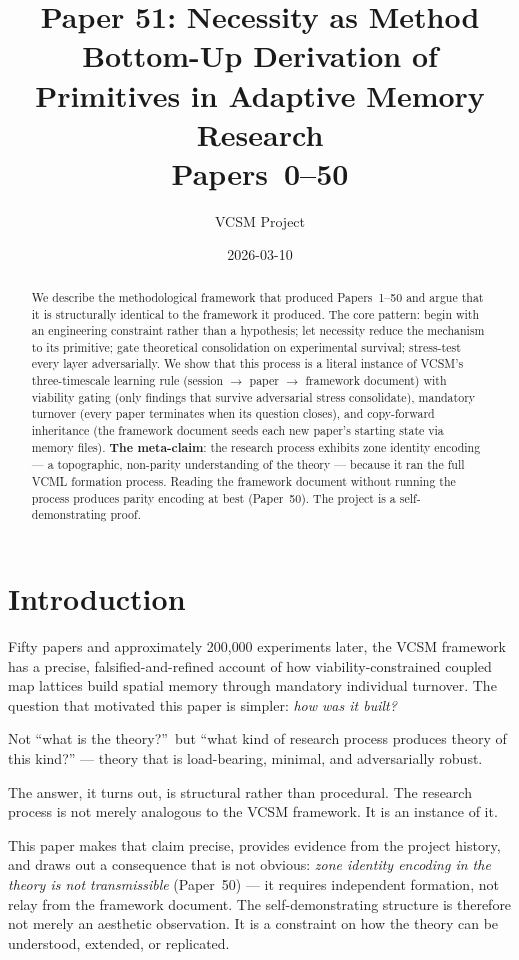 \documentclass[11pt,a4paper]{article}
\title{\textbf{Paper 51: Necessity as Method}\\
\large Bottom-Up Derivation of Primitives in Adaptive Memory Research\\
\normalsize Papers~0--50}
\author{VCSM Project}
\date{2026-03-10}
\begin{document}
\maketitle

\begin{abstract}
We describe the methodological framework that produced Papers~1--50
and argue that it is structurally identical to the framework it produced.
The core pattern: begin with an engineering constraint rather than a hypothesis;
let necessity reduce the mechanism to its primitive; gate theoretical consolidation
on experimental survival; stress-test every layer adversarially.
We show that this process is a literal instance of VCSM's three-timescale learning
rule (session $\to$ paper $\to$ framework document)
with viability gating (only findings that survive adversarial stress consolidate),
mandatory turnover (every paper terminates when its question closes),
and copy-forward inheritance (the framework document seeds each new paper's
starting state via memory files).
\textbf{The meta-claim}: the research process exhibits zone identity encoding ---
a topographic, non-parity understanding of the theory ---
because it ran the full VCML formation process.
Reading the framework document without running the process
produces parity encoding at best (Paper~50).
The project is a self-demonstrating proof.
\end{abstract}

\section{Introduction}

Fifty papers and approximately 200{,}000 experiments later, the VCSM framework
has a precise, falsified-and-refined account of how viability-constrained coupled
map lattices build spatial memory through mandatory individual turnover.
The question that motivated this paper is simpler: \emph{how was it built?}

Not ``what is the theory?''\ but ``what kind of research process produces theory
of this kind?'' --- theory that is load-bearing, minimal, and adversarially robust.

The answer, it turns out, is structural rather than procedural.
The research process is not merely analogous to the VCSM framework.
It is an instance of it.

This paper makes that claim precise, provides evidence from the project history,
and draws out a consequence that is not obvious: \emph{zone identity encoding in
the theory is not transmissible} (Paper~50) --- it requires independent formation,
not relay from the framework document.
The self-demonstrating structure is therefore not merely an aesthetic observation.
It is a constraint on how the theory can be understood, extended, or replicated.
\end{document}
